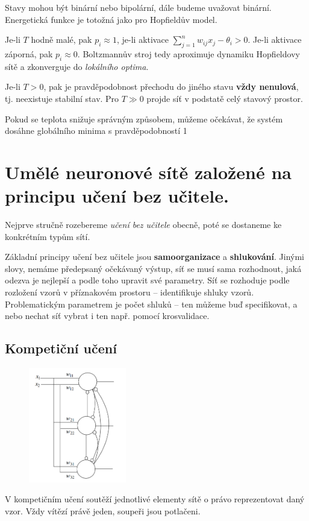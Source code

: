 \documentclass[11pt]{report} %
\numberwithin{equation}{section}
\begin{document}
Stavy mohou být binární nebo bipolární, dále budeme uvažovat binární. Energetická funkce je totožná jako pro Hopfieldův model.

Je-li $T$ hodně malé, pak $p_i \approx 1$, je-li aktivace $\sum_{j=1}^{n}w_{ij} x_j - \theta_i > 0$. Je-li aktivace záporná, pak $p_i \approx 0$. Boltzmannův stroj tedy aproximuje dynamiku Hopfieldovy sítě a zkonverguje do \textit{lokálního optima}. 

Je-li $T > 0$, pak je pravděpodobnost přechodu do jiného stavu \textbf{vždy nenulová}, tj. neexistuje stabilní stav. Pro $T \gg 0$ projde síť v podstatě celý stavový prostor. 

Pokud se teplota snižuje správným způsobem, můžeme očekávat, že systém dosáhne globálního minima s pravděpodobností 1









\section{Umělé neuronové sítě založené na principu učení bez učitele.}
Nejprve stručně rozebereme \textit{učení bez učitele} obecně, poté se dostaneme ke konkrétním typům sítí.

Základní principy učení bez učitele jsou \textbf{samoorganizace} a \textbf{shlukování}. Jinými slovy, nemáme předepsaný očekávaný výstup, síť se musí sama rozhodnout, jaká odezva je nejlepší a podle toho upravit své parametry. Síť se rozhoduje podle rozložení vzorů v příznakovém prostoru -- identifikuje shluky vzorů. Problematickým parametrem je počet shluků -- ten můžeme buď specifikovat, a nebo nechat síť vybrat i ten např. pomocí krosvalidace.

\subsection{Kompetiční učení}
\begin{figure}
	\includegraphics[width=0.38\textwidth]{img/nn_competitive.png}
\end{figure}
V kompetičním učení soutěží jednotlivé elementy sítě o právo reprezentovat daný vzor. Vždy vítězí právě jeden, soupeři jsou potlačeni.
\end{document}
